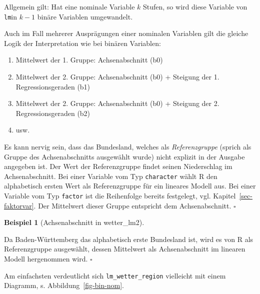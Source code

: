 \documentclass[
  letterpaper,
]{scrbook}
\providecommand{\tightlist}{%
  \setlength{\itemsep}{0pt}\setlength{\parskip}{0pt}}\usepackage{longtable,booktabs,array}
\theoremstyle{definition}
\theoremstyle{definition}
\newtheorem{example}{Beispiel}[chapter]
\theoremstyle{definition}
\theoremstyle{remark}
\begin{document}
Allgemein gilt: Hat eine nominale Variable \(k\) Stufen, so wird diese
Variable von \texttt{lm}in \(k-1\) binäre Variablen umgewandelt.

Auch im Fall mehrerer Ausprägungen einer nominalen Variablen gilt die
gleiche Logik der Interpretation wie bei binären Variablen:

\begin{enumerate}
\def\labelenumi{\arabic{enumi}.}
\tightlist
\item
  Mittelwert der 1. Gruppe: Achsenabschnitt (b0)
\item
  Mittelwert der 2. Gruppe: Achsenabschnitt (b0) + Steigung der 1.
  Regressionsgeraden (b1)
\item
  Mittelwert der 2. Gruppe: Achsenabschnitt (b0) + Steigung der 2.
  Regressionsgeraden (b2)
\item
  usw.
\end{enumerate}

Es kann nervig sein, dass das Bundesland, welches als
\emph{Referenzgruppe} (sprich als Gruppe des Achsenabschnitts ausgewählt
wurde) nicht explizit in der Ausgabe angegeben ist. Der Wert der
Referenzgruppe findet seinen Niederschlag im Achsenabschnitt. Bei einer
Variable vom Typ \texttt{character} wählt R den alphabetisch ersten Wert
als Referenzgruppe für ein lineares Modell aus. Bei einer Variable vom
Typ \texttt{factor} ist die Reihenfolge bereits festgelegt, vgl.
Kapitel~\ref{sec-faktorvar}. Der Mittelwert dieser Gruppe entspricht dem
Achsenabschnitt. \(\square\)

\begin{example}[Achsenabschnitt in
wetter\_lm2]\protect\hypertarget{exm-bawü}{}\label{exm-bawü}

Da Baden-Württemberg das alphabetisch erste Bundesland ist, wird es von
R als Referenzgruppe ausgewählt, dessen Mittelwert als Achsenabschnitt
im linearen Modell hergenommen wird. \(\square\)

\end{example}

Am einfachsten verdeutlicht sich \texttt{lm\_wetter\_region} vielleicht
mit einem Diagramm, s. Abbildung~\ref{fig-bin-nom}.
\end{document}
